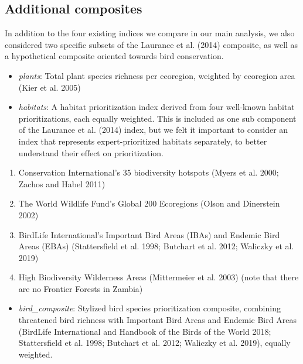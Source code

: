 \documentclass[
]{article}
\providecommand{\tightlist}{%
  \setlength{\itemsep}{0pt}\setlength{\parskip}{0pt}}
\begin{document}
\newpage

\hypertarget{additional-composites}{%
\subsection{Additional composites}\label{additional-composites}}

In addition to the four existing indices we compare in our main analysis, we also considered two specific subsets of the Laurance et al. (2014) composite, as well as a hypothetical composite oriented towards bird conservation.

\begin{itemize}
\item
  \emph{plants}: Total plant species richness per ecoregion, weighted by ecoregion area (Kier et al. 2005)
\item
  \emph{habitats}: A habitat prioritization index derived from four well-known habitat prioritizations, each equally weighted. This is included as one sub component of the Laurance et al. (2014) index, but we felt it important to consider an index that represents expert-prioritized habitats separately, to better understand their effect on prioritization.
\end{itemize}

\begin{enumerate}
\def\labelenumi{\arabic{enumi}.}
\tightlist
\item
  Conservation International's 35 biodiversity hotspots (Myers et al. 2000; Zachos and Habel 2011)
\item
  The World Wildlife Fund's Global 200 Ecoregions (Olson and Dinerstein 2002)
\item
  BirdLife International's Important Bird Areas (IBAs) and Endemic Bird Areas (EBAs) (Stattersfield et al. 1998; Butchart et al. 2012; Waliczky et al. 2019)
\item
  High Biodiversity Wilderness Areas (Mittermeier et al. 2003) (note that there are no Frontier Forests in Zambia)
\end{enumerate}

\begin{itemize}
\tightlist
\item
  \emph{bird\_composite}: Stylized bird species prioritization composite, combining threatened bird richness with Important Bird Areas and Endemic Bird Areas (BirdLife International and Handbook of the Birds of the World 2018; Stattersfield et al. 1998; Butchart et al. 2012; Waliczky et al. 2019), equally weighted.
\end{itemize}
\end{document}
